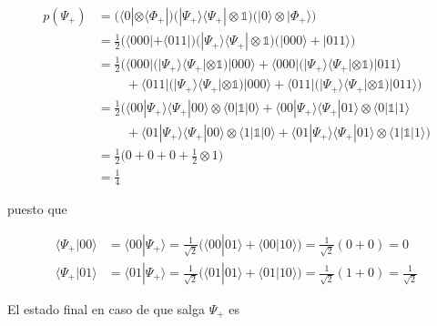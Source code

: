 \documentclass{article}
\begin{document}
\begin{align*}
  p(\Psi_+) 
    &= \Big(\langle 0| \otimes \langle \Phi_+|\Big)
       \Big(|\Psi_+\rangle\langle\Psi_+|\otimes \mathbb{1}\Big)  
       \Big(|0\rangle \otimes |\Phi_+\rangle\Big) \\
    &= \frac{1}{2}
    \Big(\langle 000| + \langle 011|\Big)
    \Big(|\Psi_+\rangle\langle \Psi_+| \otimes \mathbb{1}\Big)
    \Big(|000\rangle + |011\rangle\Big) \\
    &= \frac{1}{2}
      \Big(\langle 000|
        \big(|\Psi_+ \rangle\langle \Psi_+|\otimes \mathbb{1}\big)
      |000\rangle +
      \langle 000|
        \big(|\Psi_+ \rangle\langle \Psi_+|\otimes \mathbb{1}\big)
      |011\rangle \\ &\;\;\;\;\;\;\;\;+
      \langle 011|
        \big(|\Psi_+ \rangle\langle \Psi_+|\otimes \mathbb{1}\big)
      |000\rangle +
      \langle 011|
        \big(|\Psi_+ \rangle\langle \Psi_+|\otimes \mathbb{1}\big)
      |011\rangle
    \Big) \\
    &= \frac{1}{2}\Big(
      \langle 00|\Psi_+ \rangle\langle \Psi_+|00\rangle
      \otimes 
      \langle 0|\mathbb{1}|0\rangle +
      \langle 00|\Psi_+ \rangle\langle \Psi_+|01\rangle
      \otimes 
      \langle 0|\mathbb{1}|1\rangle \\ &\;\;\;\;\;\;\;\;+
      \langle 01|\Psi_+ \rangle\langle \Psi_+|00\rangle
      \otimes 
      \langle 1|\mathbb{1}|0\rangle +
      \langle 01|\Psi_+ \rangle\langle \Psi_+|01\rangle
      \otimes 
      \langle 1|\mathbb{1}|1\rangle
      \Big) \\ 
   &= \frac{1}{2}\Big(
      0 + 0 + 0 + \frac{1}{2} \otimes 1
      \Big) \\ 
   &= \frac{1}{4} 
\end{align*}

puesto que 

\begin{align*}
  \langle \Psi_+|00\rangle 
    &= \langle 00|\Psi_+\rangle 
    = \frac{1}{\sqrt{2}}\Big(
    \langle 00|01\rangle + \langle 00|10\rangle\Big)
    = \frac{1}{\sqrt{2}}(0 + 0)
    = 0 \\
  \langle \Psi_+|01\rangle
    &=\langle 01|\Psi_+\rangle 
    = \frac{1}{\sqrt{2}}\Big(
      \langle 01|01\rangle + \langle 01|10\rangle\Big)
    = \frac{1}{\sqrt{2}}(1 + 0)
    = \frac{1}{\sqrt{2}}
\end{align*}

El estado final en caso de que salga $\Psi_+$ es 
\end{document}
